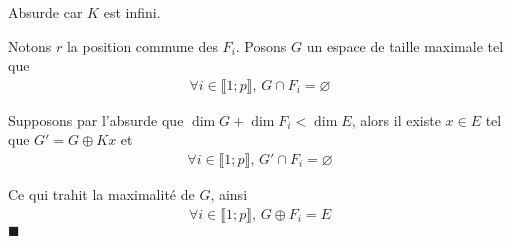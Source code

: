 \documentclass{article}
\newcommand*{\QED}{\hfill\ensuremath{\blacksquare}}%
\begin{document}
Absurde car $K$ est infini. 

Notons $r$ la position commune des $F_i$. Posons $G$ un espace de taille maximale tel que 
\begin{align*}
	\forall i \in \llbracket 1;p\rrbracket,\, G\cap F_i = \varnothing
\end{align*}

Supposons par l'absurde que $\dim G +\dim F_i < \dim E$, alors il existe $x\in E$ tel que $G' = G\oplus Kx$ et 
\begin{align*}
	\forall i \in \llbracket 1;p\rrbracket,\, G'\cap F_i = \varnothing
\end{align*}

Ce qui trahit la maximalité de $G$, ainsi 
\begin{align*}
	\forall i \in \llbracket 1;p\rrbracket,\, G \oplus F_i = E
\end{align*}
\QED
\end{document}
